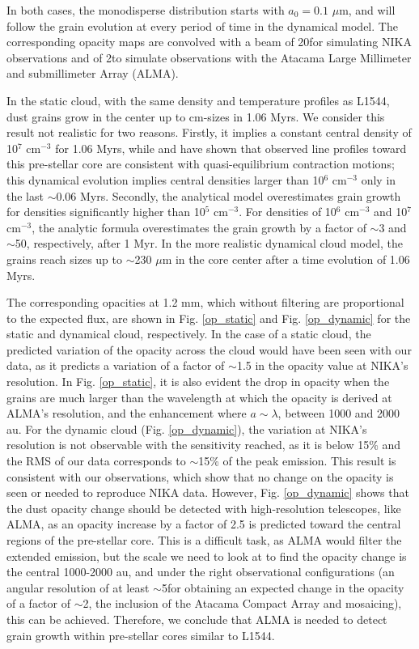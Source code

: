 \documentclass{aa}
\begin{document}
In both cases, the monodisperse distribution starts with $a_0 = 0.1$ $\mu$m, and will follow the grain evolution at every period of time in the  dynamical model.
The corresponding opacity maps are convolved with a beam of 20\arcsec for simulating NIKA observations and of 2\arcsec to simulate observations with the Atacama Large Millimeter and submillimeter Array (ALMA). 

In the static cloud, with the same density and temperature profiles as L1544, dust grains grow in the center up to cm-sizes in 1.06 Myrs. We consider this result not realistic for two reasons.  Firstly, it implies a constant central density of 10$^7$ cm$^{-3}$ for 1.06 Myrs, while  and  have shown that observed line profiles toward this pre-stellar core are consistent with quasi-equilibrium contraction motions; this dynamical evolution implies central densities larger than 10$^6$ cm$^{-3}$ only in the last $\sim$0.06 Myrs. Secondly, the analytical model overestimates grain growth for densities significantly higher than 10$^5$ cm$^{-3}$. For densities of 10$^6$ cm$^{-3}$ and 10$^7$ cm$^{-3}$, the analytic formula overestimates the grain growth by a factor of $\sim$3 and $\sim$50, respectively, after 1 Myr. In the more realistic dynamical cloud model, the grains reach sizes up to $\sim$230 $\mu$m in the core center after a time evolution of 1.06 Myrs. 

The corresponding opacities at 1.2 mm, which without filtering are proportional to the expected flux, are shown in Fig. \ref{op_static} and Fig. \ref{op_dynamic} for the static and dynamical cloud, respectively. In the case of a static cloud, the predicted variation of the opacity across the cloud would have been seen with our data, as it predicts a variation of a factor of $\sim$1.5 in the opacity value at NIKA's resolution. In Fig. \ref{op_static}, it is also evident the drop in opacity when the grains are much larger than the wavelength at which the opacity is derived at ALMA's resolution, and the enhancement where $a \sim \lambda$, between 1000 and 2000 au. For the dynamic cloud (Fig. \ref{op_dynamic}), the variation at NIKA's resolution is not observable with the sensitivity reached, as it is below 15\% and the RMS of our data corresponds to $\sim$15\% of the peak emission. This result is consistent with our observations, which show that no change on the opacity is seen or needed to reproduce NIKA data. However,  Fig. \ref{op_dynamic} shows that the dust opacity change should be detected with high-resolution telescopes, like ALMA, as an opacity increase by a factor of 2.5 is predicted toward the central regions of the pre-stellar core. This is a difficult task, as ALMA would filter the extended emission, but the scale we need to look at to find the opacity change is the central 1000-2000 au, and under the right observational configurations (an angular resolution of at least $\sim$5\arcsec for obtaining an expected change in the opacity of a factor of $\sim$2, the inclusion of the Atacama Compact Array and mosaicing), this can be achieved. Therefore, we conclude that ALMA is needed to detect grain growth within pre-stellar cores similar to L1544. 
\end{document}
